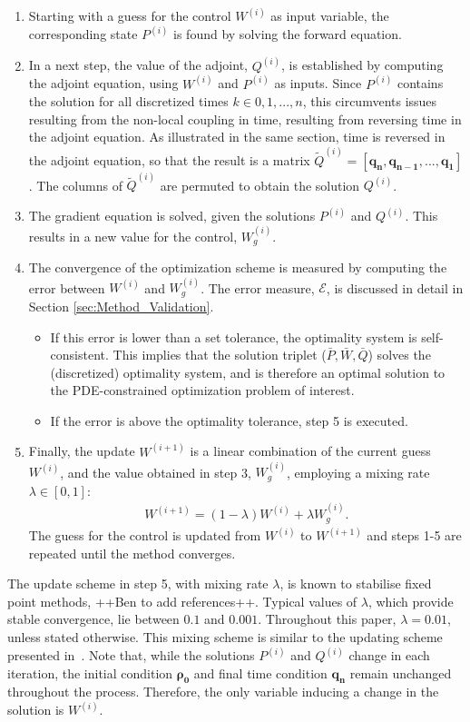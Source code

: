 \documentclass[11pt, a4paper]{article}
\theoremstyle{definition}
\newcommand{\adj}{q}
\begin{document}
\begin{enumerate}
	\item Starting with a guess for the control $W^{(i)}$ as input variable, the corresponding state $P^{(i)}$ is found by solving the forward equation.
	\item In a next step, the value of the adjoint, $Q^{(i)}$, is established by computing the adjoint equation, using $W^{(i)}$ and $P^{(i)}$ as inputs. Since $P^{(i)}$ contains the solution for all discretized times $k \in 0,1,...,n$, this circumvents issues resulting from the non-local coupling in time, resulting from reversing time in the adjoint equation. As illustrated in the same section, time is reversed in the adjoint equation, so that the result is a matrix $\tilde{Q}^{(i)} =  [\boldsymbol{\adj_n},\boldsymbol{\adj_{n-1}}, ..., \boldsymbol{\adj_1} ]$. The columns of $\tilde{Q}^{(i)}$ are permuted to obtain the solution  $Q^{(i)}$.
	\item The gradient equation is solved, given the solutions $P^{(i)}$ and $Q^{(i)}$. This results in a new value for the control, $W^{(i)}_g$.
	\item  The convergence of the optimization scheme is measured by computing the error between $W^{(i)}$ and $W^{(i)}_{g}$. The error measure, $\mathcal{E}$, is discussed in detail in Section \ref{sec:Method_Validation}. 
	\begin{itemize}
		\item  If this error is lower than a set tolerance, the optimality system is self-consistent. This implies that the solution triplet ($\bar{P},\bar{W},\bar{Q}$) solves the (discretized) optimality system, and is therefore an optimal solution to the PDE-constrained optimization problem of interest.
		\item If the error is above the optimality tolerance, step 5 is executed.
	\end{itemize}
	\item Finally, the update $W^{(i+1)}$ is a linear combination of the current guess $W^{(i)}$, and the value obtained in step 3, $W^{(i)}_{g}$, employing a mixing rate $\lambda \in [0,1]$:
	\begin{align*}
	W^{(i+1)} = (1-\lambda)W^{(i)} + \lambda W^{(i)}_{g}.
	\end{align*}
	The guess for the control is updated from $W^{(i)} $ to $W^{(i+1)} $ and steps 1-5 are repeated until the method converges. 
\end{enumerate}
\vspace{0.3cm}
The update scheme in step 5, with mixing rate $\lambda$, is known to stabilise fixed point methods, ++Ben to add references++. Typical values of $\lambda$, which provide stable convergence, lie between $0.1$ and $0.001$. Throughout this paper, $\lambda =0.01$, unless stated otherwise. This mixing scheme is similar to the updating scheme presented in~\cite{Burger1}. 
Note that, while the solutions $P^{(i)}$ and $Q^{(i)}$ change in each iteration, the initial condition $\boldsymbol{\rho_0}$ and final time condition $\boldsymbol{\adj_n}$ remain unchanged throughout the process. Therefore, the only variable inducing a change in the solution is $W^{(i)}$.
\end{document}
